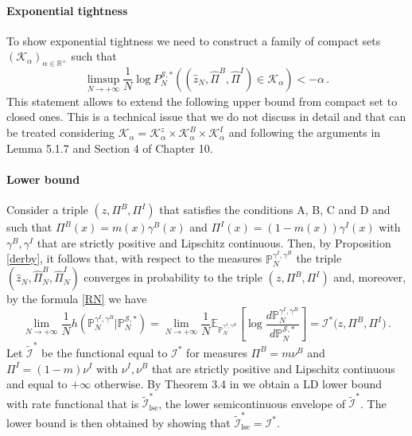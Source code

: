 \documentclass[reqno]{amsart}
\theoremstyle{plain}
\theoremstyle{definition}
\theoremstyle{remark}
\numberwithin{equation}{section}
\numberwithin{theorem}{section}
\renewcommand{\hat}{\widehat}
\newcommand{\<}{\langle}
\renewcommand{\>}{\rangle}
\begin{document}
	\paragraph{\bf Exponential tightness}
	
	To show exponential tightness we need to construct a family of compact sets $\left(\mathcal K_\alpha\right)_{\alpha \in \mathbb R^+}$ such that
	$$
	\limsup_{N\to+\infty} \frac 1N \log P^{\mathcal S,*}_N\left((\hat z_N, \hat \Pi^B, \hat \Pi^I)\in \mathcal K_\alpha\right)< -\alpha\,.
	$$
	This statement allows to extend the following upper bound from compact set to closed ones. This is a technical issue that we do not discuss in detail and that can be treated considering $\mathcal K_\alpha=\mathcal K_\alpha^z\times\mathcal K_\alpha^B\times \mathcal K_\alpha^I$ and following the arguments in \cite{DZ} Lemma 5.1.7 and \cite{KL} Section 4 of Chapter 10.
	
	\paragraph{\bf Lower bound}
	Consider a triple $(z, \Pi^B, \Pi^I)$ that satisfies the conditions A, B, C and D and such that $\Pi^B(x)=m(x)\gamma^B(x)$ and $\Pi^I(x)=(1-m(x))\gamma^I(x)$ with $\gamma^B,\gamma^I$ that are strictly positive and Lipschitz continuous. Then, by Proposition \ref{derby}, it follows that, with respect to the measures $\mathbb P^{\gamma^I,\gamma^B}_N$ the triple $\left(\hat z_N,\hat{\Pi}_N^B,\hat{\Pi}_N^I\right)$ converges in probability to the triple $(z,\Pi^B,\Pi^I)$ and, moreover, by the formula \eqref{RN} we have
	\begin{equation}
		\lim_{N\to +\infty}\frac 1Nh\left( \mathbb P^{\gamma^I,\gamma^B}_N \Big | \mathbb P^{\mathcal S,*}_N\right) 
		=\lim_{N\to +\infty}\frac 1N \mathbb E_{\mathbb P^{\gamma^I,\gamma^B}_N}\left[\log \frac{d \mathbb P^{\gamma^I,\gamma^B}_N}{d \mathbb P^{\mathcal S,*}_N}\right] = \mathcal I^*\Big(z,\Pi^B,\Pi^I\Big)\,.
	\end{equation}
	Let $\tilde{\mathcal I}^*$ be the functional equal to $\mathcal I^*$ for measures $\Pi^B=m\nu^B$ and $\Pi^I=(1-m)\nu^I$ with $\nu^I, \nu^B$ that are strictly positive and Lipschitz continuous and  equal to $+\infty$ otherwise.
	By Theorem 3.4 in \cite{M} we obtain a LD lower bound with rate functional that is $\tilde{\mathcal I}^*_{\textrm{lse}}$, the lower semicontinuous envelope of $\tilde{\mathcal I}^*$. The lower bound is then obtained by showing that $\tilde{\mathcal I}^*_{\textrm{lse}}=\mathcal I^*$.
	
\end{document}
